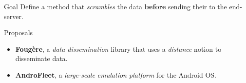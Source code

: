 \begin{frame}{Goal}
    \LARGE{Define a method that \textit{scrambles} the data \textbf{before} sending their to the end-server.}
\end{frame}

\begin{frame}{Proposals}
    \begin{itemize}
	    \item \textbf{Foug\`ere}, a \textit{data dissemination} library that uses a \textit{distance} notion to disseminate data.
	    \item \textbf{AndroFleet}, a \textit{large-scale emulation platform} for the Android OS. 
    \end{itemize} 
\end{frame}
